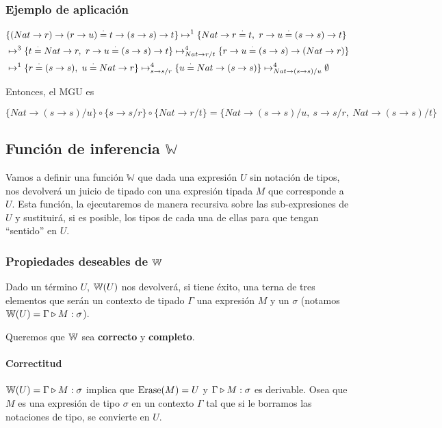 \subsubsection{Ejemplo de aplicación}
\begin{equation*}
	\begin{split}
		&\{(Nat\to r)\to(r\to u) \overset{\cdot}{=} t\to(s\to s)\to t\}
		\mapsto^1 \{Nat\to r\overset{\cdot}{=} t,~r\to u\overset{\cdot}{=} (s\to s)\to t\} \\
		&\mapsto^3 \{t\overset{\cdot}{=} Nat\to r,~r\to u\overset{\cdot}{=} (s\to s)\to t\} 
		\mapsto^4_{Nat\to r/t} \{r\to u\overset{\cdot}{=} (s\to s)\to (Nat\to r)\} \\
		&\mapsto^1 \{r\overset{\cdot}{=}(s\to s),~u\overset{\cdot}{=} Nat\to r\} 
		\mapsto^4_{s\to s/r} \{u\overset{\cdot}{=} Nat\to (s\to s)\}
		\mapsto^4_{Nat\to(s\to s)/u} \emptyset \\
	\end{split}
\end{equation*}

Entonces, el MGU es 

$\{Nat\to(s\to s)/u\}\circ\{s\to s/r\}\circ\{Nat\to r/t\} = \{Nat\to(s\to s)/u,~s\to s/r,~Nat\to (s\to s)/t\}$

\subsection{Función de inferencia \texorpdfstring{$\mathbb{W}$}{W}}
Vamos a definir una función $\mathbb{W}$ que dada una expresión $U$ sin notación de tipos, nos devolverá un juicio de tipado con una expresión tipada $M$ que corresponde a $U$. Esta función, la ejecutaremos de manera recursiva sobre las sub-expresiones de $U$ y sustituirá, si es posible, los tipos de cada una de ellas para que tengan ``sentido'' en $U$.




\subsubsection{Propiedades deseables de \texorpdfstring{$\mathbb{W}$}{W}}
Dado un término $U$, $\mathbb{W}(U)$ nos devolverá, si tiene éxito, una terna de tres elementos que serán un contexto de tipado $\Gamma$ una expresión $M$ y un $\sigma$ (notamos $\mathbb{W}(U) = \Gamma\triangleright M : \sigma$).

Queremos que $\mathbb{W}$ sea \textbf{correcto} y \textbf{completo}.

\paragraph{Correctitud} $\mathbb{W}(U) = \Gamma\triangleright M : \sigma$ implica que $\operatorname{Erase}(M) = U$ y $\Gamma\triangleright M : \sigma$ es derivable. Osea que $M$ es una expresión de tipo $\sigma$ en un contexto $\Gamma$ tal que si le borramos las notaciones de tipo, se convierte en $U$.


